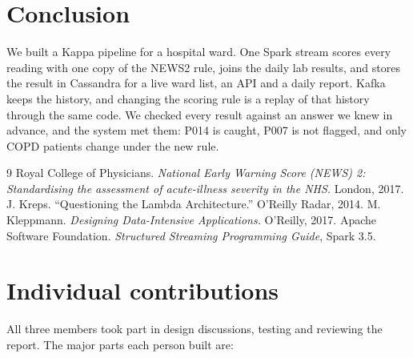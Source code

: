 \documentclass[11pt,a4paper]{article}
\begin{document}
\section{Conclusion}

We built a Kappa pipeline for a hospital ward. One Spark stream scores every reading
with one copy of the NEWS2 rule, joins the daily lab results, and stores the result in
Cassandra for a live ward list, an API and a daily report. Kafka keeps the history, and
changing the scoring rule is a replay of that history through the same code. We checked
every result against an answer we knew in advance, and the system met them: P014 is
caught, P007 is not flagged, and only COPD patients change under the new rule.

\begin{thebibliography}{9}
 Royal College of Physicians. \emph{National Early Warning Score (NEWS) 2:
Standardising the assessment of acute-illness severity in the NHS.} London, 2017.
 J. Kreps. ``Questioning the Lambda Architecture.'' O'Reilly Radar, 2014.
 M. Kleppmann. \emph{Designing Data-Intensive Applications.}
O'Reilly, 2017.
 Apache Software Foundation. \emph{Structured Streaming Programming
Guide}, Spark 3.5.
\end{thebibliography}

\appendix

\section{Individual contributions}\label{app:contrib}

All three members took part in design discussions, testing and reviewing the report.
The major parts each person built are:
\end{document}

